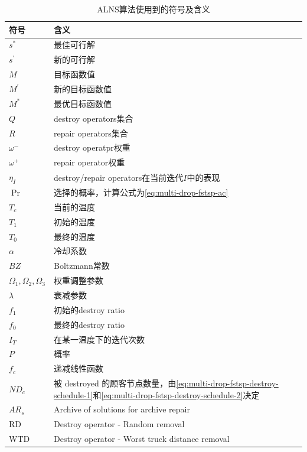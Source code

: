 \begin{table}[!htbp]
    \centering
    \caption{ALNS算法使用到的符号及含义}
    \label{tab:multi-drop-fstsp-alns-sign-meaning}
    \begin{tabularx}{\textwidth}{lX}
        \toprule[1pt]
        符号 & 含义 \\
        \midrule[0.75pt]
        $s^*$ & 最佳可行解\\
        $s^\prime$ & 新的可行解\\ 
        $M$ & 目标函数值\\
        $M^\prime$ & 新的目标函数值\\
        $M^*$ & 最优目标函数值\\ 
        $Q$ & destroy operators集合\\ 
        $R$ & repair operators集合\\
        $\omega^-$ & destroy operatpr权重\\
        $\omega^+$ & repair operator权重\\
        $\eta_I$ & destroy/repair operators在当前迭代$I$中的表现\\ 
        $\Pr$ & 选择的概率，计算公式为\ref{eq:multi-drop-fstsp-ac}\\
        $T_c$ & 当前的温度 \\
        $T_1$ & 初始的温度 \\
        $T_0$ & 最终的温度 \\ 
        $\alpha$ & 冷却系数\\ 
        $BZ$ & Boltzmann常数\\ 
        $\Omega_1, \Omega_2, \Omega_3$ & 权重调整参数\\
        $\lambda$ & 衰减参数\\
        $f_1$ & 初始的destroy ratio\\
        $f_0$ & 最终的destroy ratio\\
        $I_T$ & 在某一温度下的迭代次数\\ 
        $P$ & 概率\\
        $f_c$ & 递减线性函数\\ 
        $ND_c$ & 被 destroyed 的顾客节点数量，由\ref{eq:multi-drop-fstsp-destroy-schedule-1}和\ref{eq:multi-drop-fstsp-destroy-schedule-2}决定\\ 
        $AR_s$ & Archive of solutions for archive repair\\ 
        RD & Destroy operator - Random removal\\ 
        WTD & Destroy operator - Worst truck distance removal\\

\end{tabularx}
\end{table}
